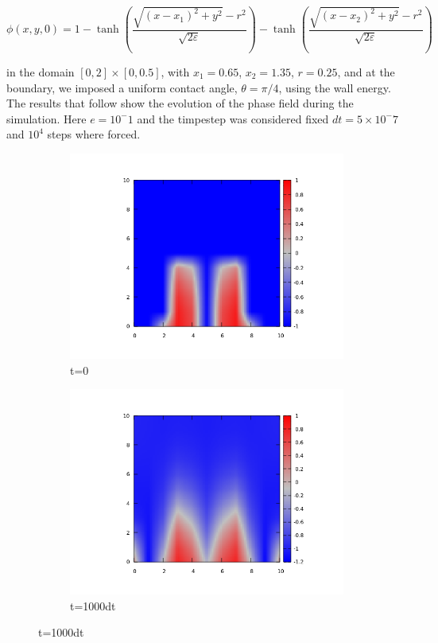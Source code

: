 \documentclass{article}
\begin{document}
\[
\phi(x,y,0) = 1 - \tanh \left( \frac{\sqrt{(x - x_1)^2 + y^2} - r^2}{\sqrt{2\varepsilon}} \right) - \tanh \left( \frac{\sqrt{(x - x_2)^2 + y^2} - r^2}{\sqrt{2\varepsilon}} \right)
\]

in the domain \([0, 2] \times [0, 0.5]\), with \(x_1 = 0.65\), \(x_2 = 1.35\), \(r = 0.25\), and at the boundary, we imposed a uniform contact angle, \(\theta = \pi/4\), using the wall energy.
The results that follow show the evolution of the phase field during the simulation. Here $e=10^-1$ and the timpestep was considered fixed $ dt = 5\times10^-7$ and $10^4$ steps where forced.

\vfill
\begin{figure}
\centering
\begin{subfigure}{.5\textwidth}
  \centering
  \includegraphics[width=1.0\linewidth]{initialcontact.png}
  \caption{t=0}
  \label{fig:sub1}
\end{subfigure}%
\begin{subfigure}{.5\textwidth}
  \centering
  \includegraphics[width=1.0\linewidth]{1000contact.png}
  \caption{t=1000dt}
  \label{fig:sub2}
\end{subfigure}
\label{fig:test}
\end{figure}
\end{document}

